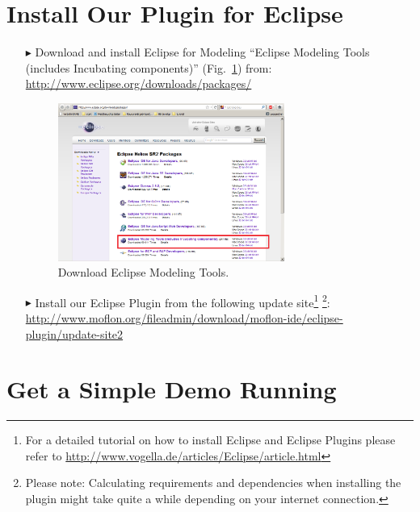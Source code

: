 \section{Install Our Plugin for Eclipse}
\begin{enumerate}
\item[$\blacktriangleright$] Download and install Eclipse for Modeling
``Eclipse Modeling Tools (includes Incubating components)''
(Fig.~\ref{fig_downloadModelingPackage}) from:\\  
\url{http://www.eclipse.org/downloads/packages/}
\begin{figure}[!h]
	\centering
  \includegraphics[width=0.7\textwidth]{pics/eclipse_modelingpackage.png}
	\caption{Download Eclipse Modeling Tools.}
	\label{fig_downloadModelingPackage}
\end{figure}
\item[$\blacktriangleright$] Install our Eclipse Plugin from the following
update site\footnote{For a detailed tutorial on how to install Eclipse and
Eclipse Plugins please refer to
\url{http://www.vogella.de/articles/Eclipse/article.html}} 
\footnote{Please note: Calculating requirements and dependencies when installing
the plugin might take quite a while depending on your internet connection.}:
\url{http://www.moflon.org/fileadmin/download/moflon-ide/eclipse-plugin/update-site2}
\end{enumerate}

\newpage

\section{Get a Simple Demo Running}

